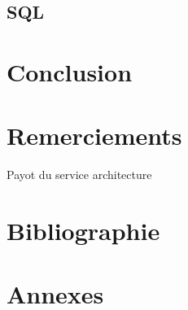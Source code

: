 \documentclass[11pt,a4paper]{article}
\begin{document}
  \subsection{SQL}

\section{Conclusion}

\section{Remerciements}
  Payot du service architecture

\section{Bibliographie}

\section{Annexes}
\end{document}
